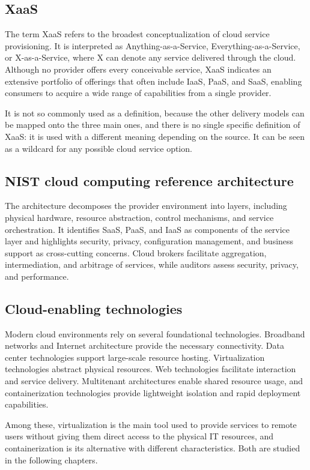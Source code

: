 \begin{center}
\end{center}

\subsection{XaaS}

The term XaaS refers to the broadest conceptualization of cloud service provisioning. It is interpreted as Anything-as-a-Service, Everything-as-a-Service, or X-as-a-Service, where X can denote any service delivered through the cloud. Although no provider offers every conceivable service, XaaS indicates an extensive portfolio of offerings that often include IaaS, PaaS, and SaaS, enabling consumers to acquire a wide range of capabilities from a single provider.

It is not so commonly used as a definition, because the other delivery models can be mapped onto the three main ones, and there is no single specific definition of XaaS: it is used with a different meaning depending on the source. It can be seen as a wildcard for any possible cloud service option.

\subsection{NIST cloud computing reference architecture}

The architecture decomposes the provider environment into layers, including physical hardware, resource abstraction, control mechanisms, and service orchestration. It identifies SaaS, PaaS, and IaaS as components of the service layer and highlights security, privacy, configuration management, and business support as cross-cutting concerns. Cloud brokers facilitate aggregation, intermediation, and arbitrage of services, while auditors assess security, privacy, and performance.

\begin{center}
\end{center}

\subsection{Cloud-enabling technologies}

Modern cloud environments rely on several foundational technologies. Broadband networks and Internet architecture provide the necessary connectivity. Data center technologies support large-scale resource hosting. Virtualization technologies abstract physical resources. Web technologies facilitate interaction and service delivery. Multitenant architectures enable shared resource usage, and containerization technologies provide lightweight isolation and rapid deployment capabilities.

Among these, virtualization is the main tool used to provide services to remote users without giving them direct access to the physical IT resources, and containerization is its alternative with different characteristics. Both are studied in the following chapters.

